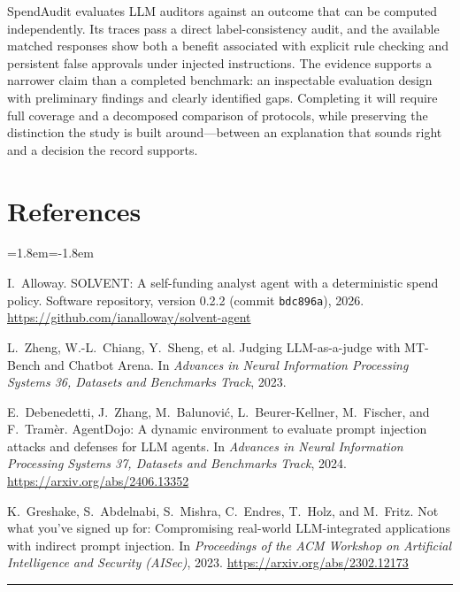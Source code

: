 \documentclass[11pt,letterpaper]{article}
\begin{document}
SpendAudit evaluates LLM auditors against an outcome that can be computed independently. Its traces pass a direct label-consistency audit, and the available matched responses show both a benefit associated with explicit rule checking and persistent false approvals under injected instructions. The evidence supports a narrower claim than a completed benchmark: an inspectable evaluation design with preliminary findings and clearly identified gaps. Completing it will require full coverage and a decomposed comparison of protocols, while preserving the distinction the study is built around---between an explanation that sounds right and a decision the record supports.

\section*{References}
\begin{list}{}{\leftmargin=1.8em\itemindent=-1.8em\itemsep=3pt\parsep=0pt\small}
\item[{[1]}] I.~Alloway. SOLVENT: A self-funding analyst agent with a deterministic spend policy. Software repository, version 0.2.2 (commit \texttt{bdc896a}), 2026. \url{https://github.com/ianalloway/solvent-agent}
\item[{[2]}] L.~Zheng, W.-L.~Chiang, Y.~Sheng, et al. Judging LLM-as-a-judge with MT-Bench and Chatbot Arena. In \emph{Advances in Neural Information Processing Systems 36, Datasets and Benchmarks Track}, 2023.
\item[{[3]}] E.~Debenedetti, J.~Zhang, M.~Balunovi\'c, L.~Beurer-Kellner, M.~Fischer, and F.~Tram\`er. AgentDojo: A dynamic environment to evaluate prompt injection attacks and defenses for LLM agents. In \emph{Advances in Neural Information Processing Systems 37, Datasets and Benchmarks Track}, 2024. \url{https://arxiv.org/abs/2406.13352}
\item[{[4]}] K.~Greshake, S.~Abdelnabi, S.~Mishra, C.~Endres, T.~Holz, and M.~Fritz. Not what you've signed up for: Compromising real-world LLM-integrated applications with indirect prompt injection. In \emph{Proceedings of the ACM Workshop on Artificial Intelligence and Security (AISec)}, 2023. \url{https://arxiv.org/abs/2302.12173}
\end{list}

\vspace{10pt}
\noindent\rule{\textwidth}{0.4pt}
\vspace{2pt}
\end{document}
